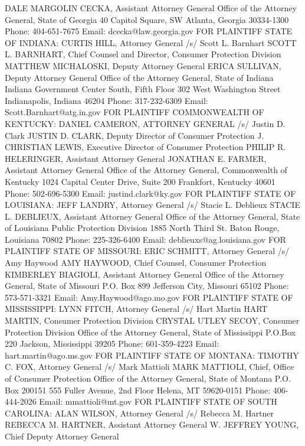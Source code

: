 \documentclass[11pt,b5paper,headings=small]{scrartcl}
\begin{document}
DALE MARGOLIN CECKA, Assistant Attorney General
Office of the Attorney General, State of Georgia
40 Capitol Square, SW
Atlanta, Georgia 30334-1300
Phone: 404-651-7675
Email: dcecka@law.georgia.gov
FOR PLAINTIFF STATE OF INDIANA:
CURTIS HILL, Attorney General
/s/ Scott L. Barnhart
SCOTT L. BARNHART, Chief Counsel and Director, Consumer Protection Division
MATTHEW MICHALOSKI, Deputy Attorney General
ERICA SULLIVAN, Deputy Attorney General
Office of the Attorney General, State of Indiana
Indiana Government Center South, Fifth Floor
302 West Washington Street
Indianapolis, Indiana 46204
Phone: 317-232-6309
Email: Scott.Barnhart@atg.in.gov
FOR PLAINTIFF COMMONWEALTH OF KENTUCKY:
DANIEL CAMERON, ATTORNEY GENERAL
/s/ Justin D. Clark
JUSTIN D. CLARK, Deputy Director of Consumer Protection
J. CHRISTIAN LEWIS, Executive Director of Consumer Protection
PHILIP R. HELERINGER, Assistant Attorney General
JONATHAN E. FARMER, Assistant Attorney General
Office of the Attorney General, Commonwealth of Kentucky
1024 Capital Center Drive, Suite 200
Frankfort, Kentucky 40601
Phone: 502-696-5300
Email: justind.clark@ky.gov
FOR PLAINTIFF STATE OF LOUISIANA:
JEFF LANDRY, Attorney General
/s/ Stacie L. Deblieux
STACIE L. DEBLIEUX, Assistant Attorney General
Office of the Attorney General, State of Louisiana
Public Protection Division
1885 North Third St.
Baton Rouge, Louisiana 70802
Phone: 225-326-6400
Email: deblieuxs@ag.louisiana.gov
FOR PLAINTIFF STATE OF MISSOURI:
ERIC SCHMITT, Attorney General
/s/ Amy Haywood
AMY HAYWOOD, Chief Counsel, Consumer Protection
KIMBERLEY BIAGIOLI, Assistant Attorney General
Office of the Attorney General, State of Missouri
P.O. Box 899
Jefferson City, Missouri 65102
Phone: 573-571-3321
Email: Amy.Haywood@ago.mo.gov
FOR PLAINTIFF STATE OF MISSISSIPPI:
LYNN FITCH, Attorney General
/s/ Hart Martin
HART MARTIN, Consumer Protection Division
CRYSTAL UTLEY SECOY, Consumer Protection Division
Office of the Attorney General, State of Mississippi
P.O.Box 220
Jackson, Mississippi 39205
Phone: 601-359-4223
Email: hart.martin@ago.ms.gov
FOR PLAINTIFF STATE OF MONTANA:
TIMOTHY C. FOX, Attorney General
/s/ Mark Mattioli
MARK MATTIOLI, Chief, Office of Consumer Protection
Office of the Attorney General, State of Montana
P.O. Box 200151
555 Fuller Avenue, 2nd Floor
Helena, MT 59620-0151
Phone: 406-444-2026
Email: mmattioli@mt.gov
FOR PLAINTIFF STATE OF SOUTH CAROLINA:
ALAN WILSON, Attorney General
/s/ Rebecca M. Hartner
REBECCA M. HARTNER, Assistant Attorney General
W. JEFFREY YOUNG, Chief Deputy Attorney General
\end{document}
